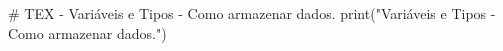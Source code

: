 # TEX - Variáveis e Tipos - Como armazenar dados.
print("Variáveis e Tipos - Como armazenar dados.")
